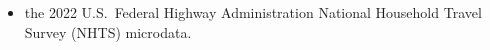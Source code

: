 \begin{itemize}
\item the 2022 U.S.~Federal Highway Administration National Household Travel Survey (NHTS) microdata.
\end{itemize}
